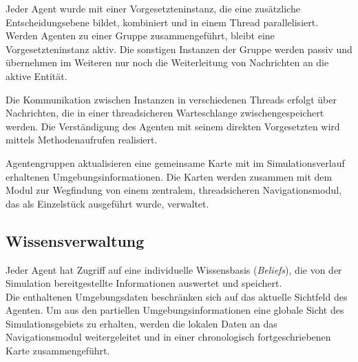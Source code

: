 \documentclass[runningheads]{llncs}
\begin{document}
Jeder Agent wurde mit einer Vorgesetzteninstanz, die eine zusätzliche Entscheidungsebene bildet, kombiniert und in einem Thread parallelisiert. Werden Agenten zu einer Gruppe zusammengeführt, bleibt eine Vorgesetzteninstanz aktiv. Die sonstigen Instanzen der Gruppe werden passiv und übernehmen im Weiteren nur noch die Weiterleitung von Nachrichten an die aktive Entität.

Die Kommunikation zwischen Instanzen in verschiedenen Threads erfolgt über Nachrichten, die in einer threadsicheren Warteschlange zwischengespeichert werden. Die Verständigung des Agenten mit seinem direkten Vorgesetzten wird mittels Methodenaufrufen realisiert.

Agentengruppen aktualisieren eine gemeinsame Karte mit im Simulationsverlauf erhaltenen Umgebungsinformationen. Die Karten werden zusammen mit dem Modul zur Wegfindung von einem zentralem, threadsicheren Navigationsmodul, das als Einzelstück ausgeführt wurde, verwaltet. 


\subsection{Wissensverwaltung}\label{wissensverwaltung}
Jeder Agent hat Zugriff auf eine individuelle Wissensbasis (\textit{Beliefs}), die von der Simulation bereitgestellte Informationen auswertet und speichert. \\
Die enthaltenen Umgebungsdaten beschränken sich auf das aktuelle Sichtfeld des Agenten.
Um aus den partiellen Umgebungsinformationen eine globale Sicht des Simulationsgebiets zu erhalten, werden die lokalen Daten an das Navigationsmodul weitergeleitet und in einer chronologisch fortgeschriebenen Karte zusammengeführt.
\end{document}
